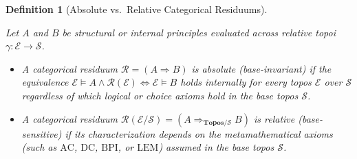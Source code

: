 \documentclass[10pt,twoside,openright]{book}
\theoremstyle{crmplain}
\theoremstyle{crmdef}
\newtheorem{definition}[theorem]{Definition}
\theoremstyle{crmremark}
\begin{document}
\begin{definition}[Absolute vs.\ Relative Categorical Residuums]\label{def:abs-rel-residuum}

Let $A$ and $B$ be structural or internal principles evaluated across relative topoi $\gamma: \mathcal{E} \to \mathcal{S}$.

\begin{itemize}[leftmargin=1.5em]

  \item A categorical residuum $\mathcal{R} = (A \Rightarrow B)$ is \emph{absolute (base-invariant)} if the equivalence $\mathcal{E} \models A \wedge \mathcal{R}(\mathcal{E}) \iff \mathcal{E} \models B$ holds internally for every topos $\mathcal{E}$ over $\mathcal{S}$ regardless of which logical or choice axioms hold in the base topos $\mathcal{S}$.

  \item A categorical residuum $\mathcal{R}(\mathcal{E}/\mathcal{S}) = (A \Rightarrow_{\mathbf{Topos}/\mathcal{S}} B)$ is \emph{relative (base-sensitive)} if its characterization depends on the metamathematical axioms (such as $\mathrm{AC}$, $\mathrm{DC}$, $\mathrm{BPI}$, or $\mathrm{LEM}$) assumed in the base topos $\mathcal{S}$.

\end{itemize}

\end{definition}
\end{document}
